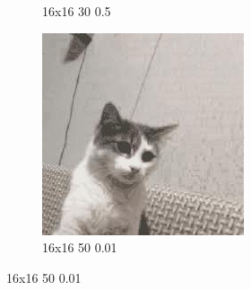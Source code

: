 \documentclass[12pt,a4paper]{article}
\begin{document}
\begin{figure}[htb]
\begin{subfigure}{0.25\textwidth}
  \caption{16x16 30 0.5}
  \label{fig:4}
\end{subfigure}\hfil %
\begin{subfigure}{0.25\textwidth}
  \includegraphics[width=\linewidth]{images/small/16-16-50-001}
  \caption{16x16 50 0.01}
  \label{fig:5}
\end{subfigure}\hfil %


\end{figure}
\end{document}

